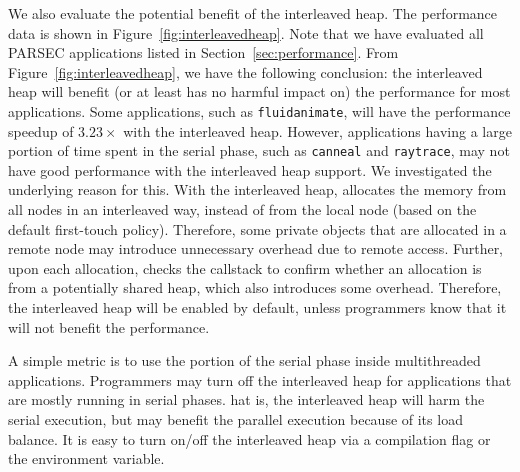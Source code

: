 We also evaluate the potential benefit of the interleaved heap. The performance data is shown in Figure~\ref{fig:interleavedheap}. Note that we have evaluated all PARSEC applications listed in Section~\ref{sec:performance}.
From Figure~\ref{fig:interleavedheap}, we have the following conclusion: the interleaved heap will benefit (or at least has no harmful impact on) the performance for most applications. Some applications, such as \texttt{fluidanimate}, will have the performance speedup of $3.23\times$ with the interleaved heap. However, applications having a large portion of time spent in the serial phase, such as \texttt{canneal} and \texttt{raytrace}, may not have good performance with the interleaved heap support. 
We investigated the underlying reason for this. With the interleaved heap, \NM{} allocates the memory from all nodes in an interleaved way, instead of from the local node (based on the default first-touch policy). Therefore, some private objects that are allocated in a remote node may introduce unnecessary overhead due to remote access. Further, upon each allocation, \NM{}  checks the callstack to confirm whether an allocation is from a potentially shared heap, which also introduces some overhead. Therefore, the interleaved heap will be enabled by default, unless programmers know that it will not benefit the performance.

A simple metric is to use the portion of the serial phase inside multithreaded applications.  Programmers may turn off the interleaved heap for applications that are mostly running in serial phases.  hat is, the interleaved heap will harm the serial execution, but may benefit the parallel execution because of its load balance. It is easy to turn on/off the interleaved heap via a compilation flag or the environment variable.  








